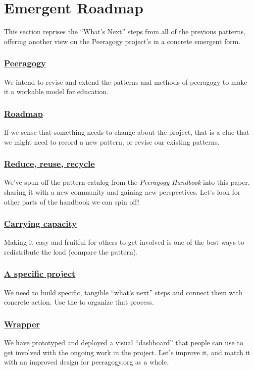 \section{Emergent Roadmap} \label{sec:Distributed_Roadmap}

This section reprises the ``What's Next'' steps from all of the previous
patterns, offering another view on the Peeragogy project's
 in a concrete emergent form.

\subsubsection*{\hyperref[sec:Peeragogy]{Peeragogy}} 
 We intend to revise and extend the patterns and methods of peeragogy to make it a workable model for education.

\subsubsection*{\hyperref[sec:Roadmap]{Roadmap}} 
If we sense that something needs to change about the project, that is a clue that we might need to record a new pattern, or revise our existing patterns.

\subsubsection*{\hyperref[sec:Reduce, reuse, recycle]{Reduce, reuse, recycle}}
We've spun off the pattern catalog from the \emph{Peeragogy Handbook} into this paper, sharing it with a new community and gaining new perspectives.  Let's look for other parts of the handbook we can spin off!

\subsubsection*{\hyperref[sec:Carrying capacity]{Carrying capacity}} 
Making it easy and fruitful for others to get involved is one of the best ways to
redistribute the load (compare the
pattern).

\subsubsection*{\hyperref[sec:A specific project]{A specific project}}
We need to build specific, tangible ``what's next'' steps and connect them with concrete action. Use the  to organize that process. 

\subsubsection*{\hyperref[sec:Wrapper]{Wrapper}}
We have prototyped and deployed a visual ``dashboard'' that people can use to get involved with the ongoing work in the project.  Let's improve it, and match it with an improved design for peeragogy.org as a whole.

